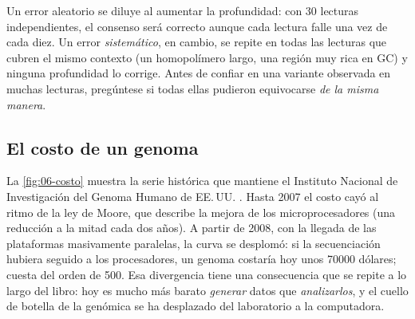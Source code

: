 \begin{cuidado}
Un error aleatorio se diluye al aumentar la profundidad: con 30 lecturas independientes, el consenso será correcto aunque cada lectura falle una vez de cada diez. Un error \emph{sistemático}, en cambio, se repite en todas las lecturas que cubren el mismo contexto (un homopolímero largo, una región muy rica en GC) y ninguna profundidad lo corrige. Antes de confiar en una variante observada en muchas lecturas, pregúntese si todas ellas pudieron equivocarse \emph{de la misma manera}.
\end{cuidado}

\subsection{El costo de un genoma}

La \cref{fig:06-costo} muestra la serie histórica que mantiene el Instituto Nacional de Investigación del Genoma Humano de EE.\,UU. \parencite{c06-nhgri2022}. Hasta 2007 el costo cayó al ritmo de la ley de Moore, que describe la mejora de los microprocesadores (una reducción a la mitad cada dos años). A partir de 2008, con la llegada de las plataformas masivamente paralelas, la curva se desplomó: si la secuenciación hubiera seguido a los procesadores, un genoma costaría hoy unos \num{70000} dólares; cuesta del orden de 500. Esa divergencia tiene una consecuencia que se repite a lo largo del libro: hoy es mucho más barato \emph{generar} datos que \emph{analizarlos}, y el cuello de botella de la genómica se ha desplazado del laboratorio a la computadora.

